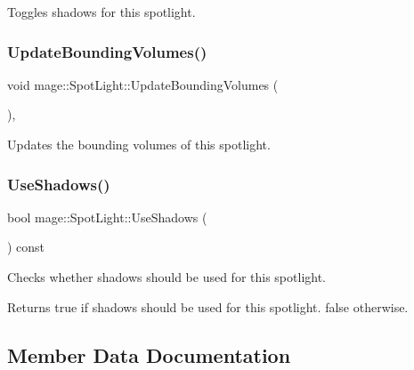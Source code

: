 Toggles shadows for this spotlight. \hypertarget{classmage_1_1_spot_light_a83035abee0050acdca47b1f95b30a793}{}\label{classmage_1_1_spot_light_a83035abee0050acdca47b1f95b30a793} 
\subsubsection{\texorpdfstring{Update\+Bounding\+Volumes()}{UpdateBoundingVolumes()}}
{\footnotesize\ttfamily void mage\+::\+Spot\+Light\+::\+Update\+Bounding\+Volumes (\begin{DoxyParamCaption}{ }\end{DoxyParamCaption})\hspace{0.3cm}{\ttfamily [private]}, {\ttfamily [noexcept]}}

Updates the bounding volumes of this spotlight. \hypertarget{classmage_1_1_spot_light_af41a8c0d83b45d048a2d1a030c1235f8}{}\label{classmage_1_1_spot_light_af41a8c0d83b45d048a2d1a030c1235f8} 
\subsubsection{\texorpdfstring{Use\+Shadows()}{UseShadows()}}
{\footnotesize\ttfamily bool mage\+::\+Spot\+Light\+::\+Use\+Shadows (\begin{DoxyParamCaption}{ }\end{DoxyParamCaption}) const\hspace{0.3cm}{\ttfamily [noexcept]}}

Checks whether shadows should be used for this spotlight.

\begin{DoxyReturn}{Returns}
{\ttfamily true} if shadows should be used for this spotlight. {\ttfamily false} otherwise. 
\end{DoxyReturn}


\subsection{Member Data Documentation}
\hypertarget{classmage_1_1_spot_light_ae0e1342ef7e3ca044bb1f16c4c3327a1}{}\label{classmage_1_1_spot_light_ae0e1342ef7e3ca044bb1f16c4c3327a1} 

